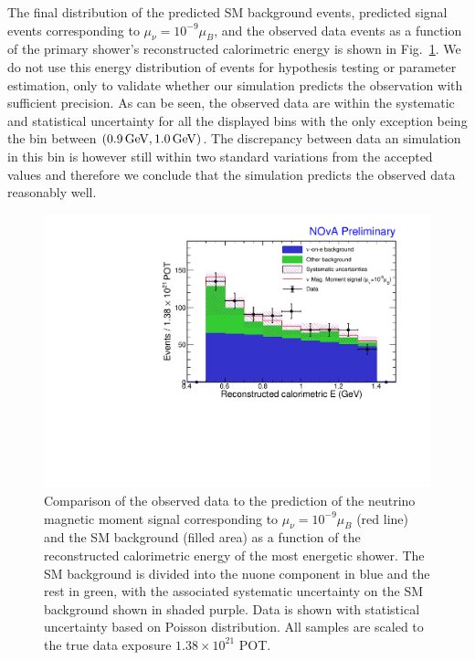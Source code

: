 The final distribution of the predicted \gls{SM} background events, predicted signal events corresponding to $\mu_{\nu}=10^{-9}\mu_B$, and the observed data events as a function of the primary shower's reconstructed calorimetric energy is shown in Fig.~\ref{fig:NuMMResults_Distribution}. We do not use this energy distribution of events for hypothesis testing or parameter estimation, only to validate whether our simulation predicts the observation with sufficient precision. As can be seen, the observed data are within the systematic and statistical uncertainty for all the displayed bins with the only exception being the bin between $\left(\unit[0.9]{GeV},\unit[1.0]{GeV}\right)$. The discrepancy between data an simulation in this bin is however still within two standard variations from the accepted values and therefore we conclude that the simulation predicts the observed data reasonably well.

\begin{figure}[hbtp]
\centering
\includegraphics[width=\textwidth]{Plots/NuMM/Stacked.pdf}
\caption[Final prediction and data comparison]{Comparison of the observed data to the prediction of the neutrino magnetic moment signal corresponding to $\mu_\nu=10^{-9}\mu_B$ (red line) and the \acrshort{SM} background (filled area) as a function of the reconstructed calorimetric energy of the most energetic shower. The \acrshort{SM} background is divided into the \acrshort{nuone} component in blue and the rest in green, with the associated systematic uncertainty on the \acrshort{SM} background shown in shaded purple. Data is shown with statistical uncertainty based on Poisson distribution. All samples are scaled to the true data exposure $1.38\times 10^{21}$ \acrshort{POT}.}
\label{fig:NuMMResults_Distribution}
\end{figure}


